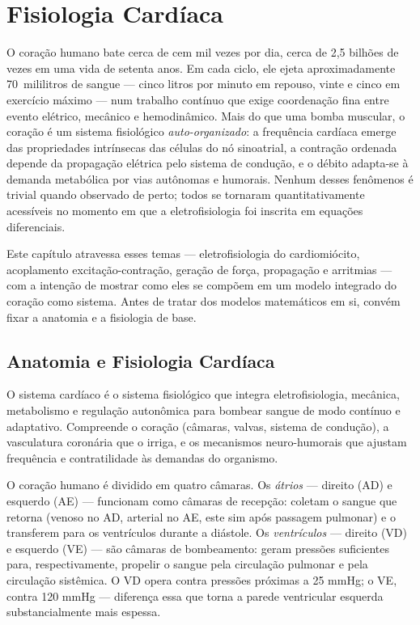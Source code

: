
\chapter{Fisiologia Cardíaca}
\label{cap:12}

\normalfont\rmfamily\upshape
O coração humano bate cerca de cem mil vezes por dia, cerca de 2,5 bilhões
de vezes em uma vida de setenta anos. Em cada ciclo, ele ejeta aproximadamente
70~mililitros de sangue --- cinco litros por minuto em repouso, vinte e
cinco em exercício máximo --- num trabalho contínuo que exige coordenação
fina entre evento elétrico, mecânico e hemodinâmico. Mais do que uma bomba
muscular, o coração é um sistema fisiológico \emph{auto-organizado}: a
frequência cardíaca emerge das propriedades intrínsecas das células do nó
sinoatrial, a contração ordenada depende da propagação elétrica pelo
sistema de condução, e o débito adapta-se à demanda metabólica por vias
autônomas e humorais. Nenhum desses fenômenos é trivial quando observado
de perto; todos se tornaram quantitativamente acessíveis no momento em que
a eletrofisiologia foi inscrita em equações diferenciais.

Este capítulo atravessa esses temas --- eletrofisiologia do cardiomiócito,
acoplamento excitação-contração, geração de força, propagação e arritmias
--- com a intenção de mostrar como eles se compõem em um modelo integrado
do coração como sistema. Antes de tratar dos modelos matemáticos em si,
convém fixar a anatomia e a fisiologia de base.

\section{Anatomia e Fisiologia Cardíaca}
\label{sec:12-anatomia}

\begin{definicaoenv}
O sistema cardíaco é o sistema fisiológico que integra eletrofisiologia,
mecânica, metabolismo e regulação autonômica para bombear sangue de modo
contínuo e adaptativo. Compreende o coração (câmaras, valvas, sistema de
condução), a vasculatura coronária que o irriga, e os mecanismos neuro-humorais
que ajustam frequência e contratilidade às demandas do organismo.
\end{definicaoenv}

O coração humano é dividido em quatro câmaras. Os \emph{átrios} --- direito
(AD) e esquerdo (AE) --- funcionam como câmaras de recepção: coletam o
sangue que retorna (venoso no AD, arterial no AE, este sim após passagem
pulmonar) e o transferem para os ventrículos durante a diástole. Os
\emph{ventrículos} --- direito (VD) e esquerdo (VE) --- são câmaras de
bombeamento: geram pressões suficientes para, respectivamente, propelir o
sangue pela circulação pulmonar e pela circulação sistêmica. O VD opera
contra pressões próximas a 25 mmHg; o VE, contra 120 mmHg --- diferença
essa que torna a parede ventricular esquerda substancialmente mais espessa.

